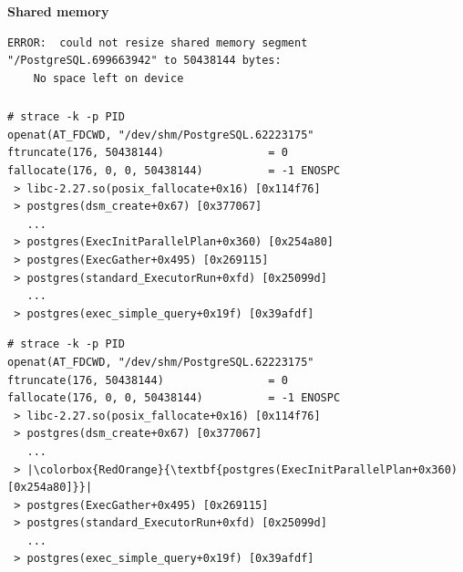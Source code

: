\documentclass[usenames,dvipsnames, 18pt, compress, aspectratio=169]{beamer}
\begin{document}
\begin{frame}[fragile]{}
    \frametitle{}
    \begin{center}
    \textbf{Shared memory}

        \begin{verbatim}
ERROR:  could not resize shared memory segment
"/PostgreSQL.699663942" to 50438144 bytes:
    No space left on device
        \end{verbatim}

    \end{center}
\end{frame}

\begin{frame}[fragile]{}
    \frametitle{}
    \begin{center}

    \begin{overprint}
        \begin{verbatim}
# strace -k -p PID
openat(AT_FDCWD, "/dev/shm/PostgreSQL.62223175"
ftruncate(176, 50438144)                = 0
fallocate(176, 0, 0, 50438144)          = -1 ENOSPC
 > libc-2.27.so(posix_fallocate+0x16) [0x114f76]
 > postgres(dsm_create+0x67) [0x377067]
   ...
 > postgres(ExecInitParallelPlan+0x360) [0x254a80]
 > postgres(ExecGather+0x495) [0x269115]
 > postgres(standard_ExecutorRun+0xfd) [0x25099d]
   ...
 > postgres(exec_simple_query+0x19f) [0x39afdf]
        \end{verbatim}

        \begin{verbatim}
# strace -k -p PID
openat(AT_FDCWD, "/dev/shm/PostgreSQL.62223175"
ftruncate(176, 50438144)                = 0
fallocate(176, 0, 0, 50438144)          = -1 ENOSPC
 > libc-2.27.so(posix_fallocate+0x16) [0x114f76]
 > postgres(dsm_create+0x67) [0x377067]
   ...
 > |\colorbox{RedOrange}{\textbf{postgres(ExecInitParallelPlan+0x360) [0x254a80]}}|
 > postgres(ExecGather+0x495) [0x269115]
 > postgres(standard_ExecutorRun+0xfd) [0x25099d]
   ...
 > postgres(exec_simple_query+0x19f) [0x39afdf]
        \end{verbatim}

    \end{overprint}
    \end{center}
\end{frame}

\end{document}
